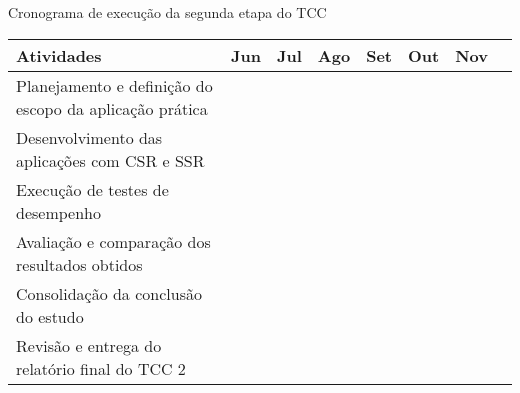 \begin{quadro}[H]
    \centering
    \caption{Cronograma de execução da segunda etapa do TCC}
    \label{tab:cronograma_etapa2}
    \renewcommand{\arraystretch}{1.5}
    \begin{tabular}{|>{\centering\arraybackslash}p{3.5cm}|>{\centering\arraybackslash}p{1.25cm}|>{\centering\arraybackslash}p{1.25cm}|>{\centering\arraybackslash}p{1.25cm}|>{\centering\arraybackslash}p{1.25cm}|>{\centering\arraybackslash}p{1.25cm}|>{\centering\arraybackslash}p{1.25cm}|>{\centering\arraybackslash}p{1.25cm}|}
    \hline
    \textbf{Atividades} & \textbf{Jun} & \textbf{Jul} & \textbf{Ago} & \textbf{Set} & \textbf{Out} & \textbf{Nov} \\
    \hline
    Planejamento e definição do escopo da aplicação prática & \cellcolor{softCyan1} &  &  &  &  & \\
    \hline
    Desenvolvimento das aplicações com CSR e SSR &  & \cellcolor{softCyan2} & \cellcolor{softCyan2} & \cellcolor{softCyan2} &  & \\
    \hline
    Execução de testes de desempenho &  &  &  & \cellcolor{emeraldSea} & \cellcolor{emeraldSea} & \\
    \hline
    Avaliação e comparação dos resultados obtidos &  &  &  &  & \cellcolor{deepTeal} &  \\
    \hline
    Consolidação da conclusão do estudo &  &  &  &  & \cellcolor{darkEmerald} & \cellcolor{darkEmerald} \\
    \hline
    Revisão e entrega do relatório final do TCC 2 &  &  &  &  &  & \cellcolor{vividTurquoise} \\
    \hline
    \end{tabular}
\end{quadro}

